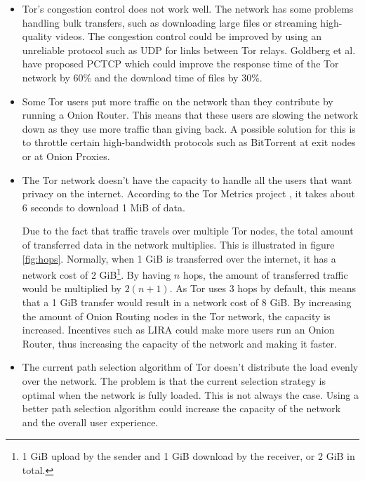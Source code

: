 \documentclass{article}
\begin{document}
		\begin{itemize}
			\item Tor's congestion control does not work well. The network has some problems handling bulk transfers, such as downloading large files or streaming high-quality videos. The congestion control could be improved by using an unreliable protocol such as UDP for links between Tor relays. Goldberg et al. \cite{alsabah2013pctcp} have proposed PCTCP which could improve the response time of the Tor network by 60\% and the download time of files by 30\%.	
		
			\item Some Tor users put more traffic on the network than they contribute by running a Onion Router. This means that these users are slowing the network down as they use more traffic than giving back. A possible solution for this is to throttle certain high-bandwidth protocols such as BitTorrent at exit nodes or at Onion Proxies.
		
			\item The Tor network doesn't have the capacity to handle all the users that want privacy on the internet. According to the Tor Metrics project \cite{tormetricsprojectwebsite}, it takes about 6 seconds to download 1 MiB of data.
			
			Due to the fact that traffic travels over multiple Tor nodes, the total amount of transferred data in the network multiplies. This is illustrated in figure \ref{fig:hops}. Normally, when 1 GiB is transferred over the internet, it has a network cost of 2 GiB\footnote{1 GiB upload by the sender and 1 GiB download by the receiver, or 2 GiB in total.}. By having $n$ hops, the amount of transferred traffic would be multiplied by $2(n+1)$. As Tor uses 3 hops by default, this means that a 1 GiB transfer would result in a network cost of 8 GiB. By increasing the amount of Onion Routing nodes in the Tor network, the capacity is increased. Incentives such as LIRA \cite{jansen13lira} could make more users run an Onion Router, thus increasing the capacity of the network and making it faster.	
		
			\item The current path selection algorithm of Tor doesn't distribute the load evenly over the network. The problem is that the current selection strategy is optimal when the network is fully loaded. This is not always the case. Using a better path selection algorithm could increase the capacity of the network and the overall user experience.		
		

\end{itemize}
\end{document}

